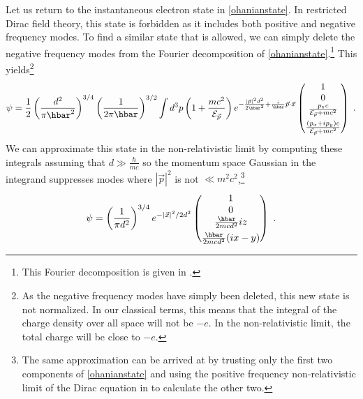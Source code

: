 \documentclass[onecolumn,secnumarabic,amsmath,amssymb,balancelastpage,nofootinbib]{article}
\begin{document}
Let us return to the instantaneous electron state in \eqref{ohanianstate}.  In restricted Dirac field theory, this state is forbidden as it includes both positive and negative frequency modes.  To find a similar state that is allowed, we can simply delete the negative frequency modes from the Fourier decomposition of \eqref{ohanianstate}.\footnote{This Fourier decomposition is given in \citealp[section 3.3]{bjorkendrell}.}  This yields\footnote{As the negative frequency modes have simply been deleted, this new state is not normalized.  In our classical terms, this means that the integral of the charge density over all space will not be $-e$.  In the non-relativistic limit, the total charge will be close to $-e$.}
\begin{equation}
\psi=\frac{1}{2}\left(\frac{d^2}{\pi \hbar^2}\right)^{3/4}\left(\frac{1}{2 \pi \hbar}\right)^{3/2}\int d^3 p \left(1+\frac{m c^2}{\mathcal{E}_{\vec{p}}}\right)e^{-\frac{|\vec{p}|^2 d^2}{2 \hbar^2}+\frac{i}{\hbar}\vec{p}\cdot\vec{x}}\left(\begin{matrix}
1\\
0\\
\frac{p_z c}{\mathcal{E}_{\vec{p}} + m c^2}\vspace*{4 pt}\\
\frac{(p_x+ i p_y) c}{\mathcal{E}_{\vec{p}} + m c^2}
\end{matrix}\right)\ .
\label{truestate}
\end{equation}
We can approximate this state in the non-relativistic limit by computing these integrals assuming that $d \gg \frac{\hbar}{m c}$ so the momentum space Gaussian in the integrand suppresses modes where $|\vec{p}|^2$ is not $\ll m^2 c^2$,\footnote{The same approximation can be arrived at by trusting only the first two components of \eqref{ohanianstate} and using the positive frequency non-relativistic limit of the Dirac equation in \citet[equation 1.31]{bjorkendrell} to calculate the other two.}
\begin{equation}
\psi=\left(\frac{1}{\pi d^2}\right)^{3/4}e^{-|\vec{x}|^2/2d^2}\left(\begin{matrix}
1\\
0\\
\frac{\hbar}{2 m c d^2}i z\vspace*{4 pt}\\
\frac{\hbar}{2 m c d^2}(i x-y)
\end{matrix}\right)\ .
\label{approxstate}
\end{equation}
\end{document}
